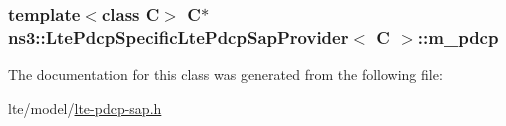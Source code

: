 \subsubsection[{\texorpdfstring{m\+\_\+pdcp}{m_pdcp}}]{\setlength{\rightskip}{0pt plus 5cm}template$<$class C$>$ {\bf C}$\ast$ {\bf ns3\+::\+Lte\+Pdcp\+Specific\+Lte\+Pdcp\+Sap\+Provider}$<$ {\bf C} $>$\+::m\+\_\+pdcp\hspace{0.3cm}{\ttfamily [private]}}\hypertarget{classns3_1_1LtePdcpSpecificLtePdcpSapProvider_ad8a2b0f987b6fe7003ee2061f18ba5d9}{}\label{classns3_1_1LtePdcpSpecificLtePdcpSapProvider_ad8a2b0f987b6fe7003ee2061f18ba5d9}


The documentation for this class was generated from the following file\+:\begin{DoxyCompactItemize}
\item 
lte/model/\hyperlink{lte-pdcp-sap_8h}{lte-\/pdcp-\/sap.\+h}\end{DoxyCompactItemize}
